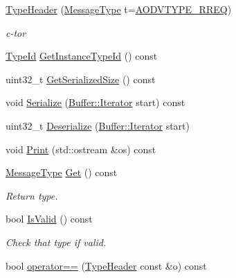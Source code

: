 \begin{DoxyCompactItemize}
\item 
\hyperlink{classns3_1_1aodv_1_1TypeHeader_a18cbffdb5f4d922a3a95a2629e766909}{Type\+Header} (\hyperlink{namespacens3_1_1aodv_a8cf417608302ba0ed75225c976944d44}{Message\+Type} t=\hyperlink{namespacens3_1_1aodv_a8cf417608302ba0ed75225c976944d44ad5f62dc18635d788b1a5b0dd834d46f0}{A\+O\+D\+V\+T\+Y\+P\+E\+\_\+\+R\+R\+EQ})
\begin{DoxyCompactList}\small\item\em c-\/tor \end{DoxyCompactList}\item 
\hyperlink{classns3_1_1TypeId}{Type\+Id} \hyperlink{classns3_1_1aodv_1_1TypeHeader_a785ce84edd0879800e80d7f764d1111d}{Get\+Instance\+Type\+Id} () const 
\item 
uint32\+\_\+t \hyperlink{classns3_1_1aodv_1_1TypeHeader_a1567c65fe13e6060e1f6b402575314fa}{Get\+Serialized\+Size} () const 
\item 
void \hyperlink{classns3_1_1aodv_1_1TypeHeader_a7972cf974ce16ee3f22819f30a0214f3}{Serialize} (\hyperlink{classns3_1_1Buffer_1_1Iterator}{Buffer\+::\+Iterator} start) const 
\item 
uint32\+\_\+t \hyperlink{classns3_1_1aodv_1_1TypeHeader_a1008c3c92926976b0bcf863508f0073a}{Deserialize} (\hyperlink{classns3_1_1Buffer_1_1Iterator}{Buffer\+::\+Iterator} start)
\item 
void \hyperlink{classns3_1_1aodv_1_1TypeHeader_ae03465404180fe7edb46f6a3b396c59a}{Print} (std\+::ostream \&os) const 
\item 
\hyperlink{namespacens3_1_1aodv_a8cf417608302ba0ed75225c976944d44}{Message\+Type} \hyperlink{classns3_1_1aodv_1_1TypeHeader_abe8094fed14d419bc21a4f7cd5570c03}{Get} () const 
\begin{DoxyCompactList}\small\item\em Return type. \end{DoxyCompactList}\item 
bool \hyperlink{classns3_1_1aodv_1_1TypeHeader_a67bc7622e310683dc0a232d0c9dae1e5}{Is\+Valid} () const 
\begin{DoxyCompactList}\small\item\em Check that type if valid. \end{DoxyCompactList}\item 
bool \hyperlink{classns3_1_1aodv_1_1TypeHeader_a25c9f3695e3ca3c8c8be1188fee35433}{operator==} (\hyperlink{classns3_1_1aodv_1_1TypeHeader}{Type\+Header} const \&o) const 
\end{DoxyCompactItemize}
